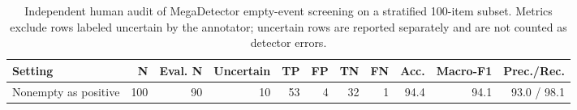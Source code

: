 \begin{table}[h]
\centering
\caption{Independent human audit of MegaDetector empty-event screening on a stratified 100-item subset. Metrics exclude rows labeled uncertain by the annotator; uncertain rows are reported separately and are not counted as detector errors.}
\label{tab:megadetector-independent-audit}
\small
\begin{tabular}{lrrrrrrrrrr}
\toprule
Setting & N & Eval. N & Uncertain & TP & FP & TN & FN & Acc. & Macro-F1 & Prec./Rec. \\
\midrule
Nonempty as positive & 100 & 90 & 10 & 53 & 4 & 32 & 1 & 94.4 & 94.1 & 93.0 / 98.1 \\
\bottomrule
\end{tabular}
\end{table}
